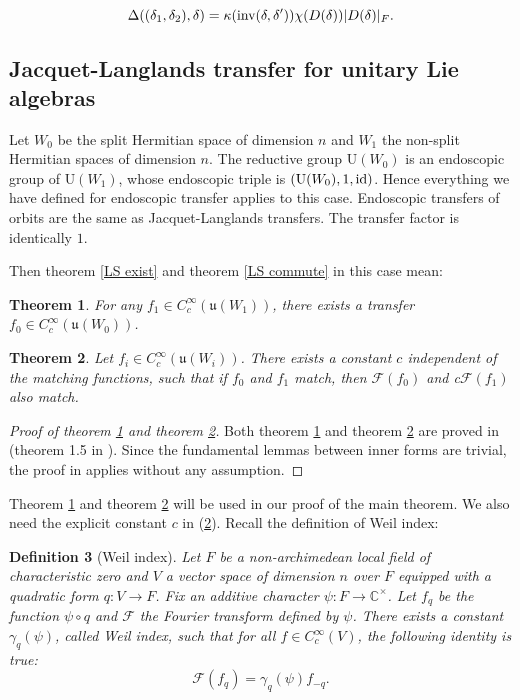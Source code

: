 \documentclass[11pt, oneside,reqno]{amsart}   	%
\newtheorem{theorem}{Theorem}[section]
\newtheorem{definition}[theorem]{Definition}
\begin{document}
$$\Delta((\delta_1,\delta_2),\delta)=\kappa(\textup{inv}(\delta,\delta^\prime)) \chi(D(\delta))|D(\delta)|_F .$$


\subsection{Jacquet-Langlands transfer for unitary Lie algebras} \label{JJ}

Let $W_0$ be the split Hermitian space of dimension $n$ and $W_1$ the non-split Hermitian spaces of dimension $n$. The reductive group U$(W_0)$ is an endoscopic group of U$(W_1)$, whose endoscopic triple is $(\textup{U}(W_0), 1, \textup{id})$. Hence everything we have defined for endoscopic transfer applies to this case. Endoscopic transfers of orbits are the same as Jacquet-Langlands transfers. The transfer factor is identically $1$.

Then theorem \ref{LS exist} and theorem \ref{LS commute} in this case mean:
\begin{theorem} \label{JL exist}
For any $f_1 \in C_c^\infty(\mathfrak{u}(W_1))$, there exists a transfer $f_0  \in C_c^\infty(\mathfrak{u}(W_0))$.
\end{theorem}

\begin{theorem} \label{JL commute}
Let $f_i \in C_c^\infty(\mathfrak{u}(W_i))$. There exists a constant $c$ independent of the matching functions, such that if $f_0$ and $f_1$ match, then $\mathcal{F}(f_0)$ and c$\mathcal{F}(f_1)$ also match.
\end{theorem}

\begin{proof}[Proof of theorem \ref{JL exist} and theorem \ref{JL commute}]
Both theorem \ref{JL exist} and theorem \ref{JL commute} are proved in \cite{Wa2} (theorem 1.5 in \cite{Wa2}). Since the fundamental lemmas between inner forms are trivial, the proof in \cite{Wa2} applies without any assumption.
\end{proof}

Theorem \ref{JL exist} and theorem \ref{JL commute} will be used in our proof of the main theorem. We also need the explicit constant $c$ in (\ref{JL commute}). Recall the definition of Weil index:
\begin{definition}[Weil index]
Let $F$ be a non-archimedean local field of characteristic zero and $V$ a vector space of dimension $n$ over $F$ equipped with a quadratic form $q: V \rightarrow F$. Fix an additive character $\psi: F \rightarrow \mathbb{C}^\times$. Let $f_q$ be the function $\psi \circ q$ and $\mathcal{F}$ the Fourier transform defined by $\psi$. There exists a constant $\gamma_q(\psi)$, called Weil index, such that for all $f \in C_c^\infty(V)$, the following identity is true:
$$\mathcal{F}(f_q)=\gamma_q(\psi)f_{-q}.$$
\end{definition}
\end{document}
